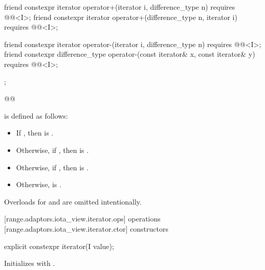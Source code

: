 \begin{codeblock}
{{    friend constexpr iterator operator+(iterator i, difference_type n)
      requires @@<I>;
    friend constexpr iterator operator+(difference_type n, iterator i)
      requires @@<I>;

    friend constexpr iterator operator-(iterator i, difference_type n)
      requires @@<I>;
    friend constexpr difference_type operator-(const iterator& x, const iterator& y)
      requires @@<I>;
  };
}@\oldtxt{\}}@
\end{codeblock}

\pnum
{} is defined as follows:
\begin{itemize}
\item If    , then
 is .
\item Otherwise, if    , then
 is .
\item Otherwise, if    , then
 is .
\item Otherwise,  is .
\end{itemize}

\pnum
\begin{note}
Overloads for  and  are omitted
intentionally.
\end{note}

[range.adaptors.iota_view.iterator.ops]{ operations}
[range.adaptors.iota_view.iterator.ctor]{ constructors}

\begin{itemdecl}
explicit constexpr iterator(I value);
\end{itemdecl}

\begin{itemdescr}
\pnum
\effects Initializes  with .
\end{itemdescr}

